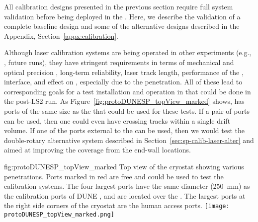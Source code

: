 
All calibration designs presented in the previous section require full system validation before being deployed in the  . Here, we describe the validation of a complete baseline design and some of the alternative designs described in the Appendix, Section~\ref{appx:calibration}.

Although laser calibration systems are being operated in other  experiments (e.g., , future  runs), they have stringent requirements in terms of mechanical and optical precision , long-term reliability, laser track length, performance of the ,  interface, and effect on \efield, especially due to the  penetration. 
All of these lead to corresponding goals for a test installation and operation in  that could be done in the post-LS2 run. As Figure~\ref{fig:protoDUNESP_topView_marked} shows,  has ports of the same size as the   that could be used for these tests. If a pair of ports can be used, then one could even have crossing tracks within a single drift volume. If one of the ports external to the  can be used, then we would test the double-rotary alternative system described in Section~\ref{sec:sp-calib-laser-alter} and aimed at improving the coverage from the end-wall locations.

\begin{dunefigure}{fig:protoDUNESP_topView_marked}
{Top view of the  cryostat showing various penetrations. Ports marked in red are free and could be used to test the calibration systems. The four largest ports have the same diameter (\SI{250}{\milli\m}) as the calibration ports of DUNE , and are located over the . The largest ports at the right side corners of the cryostat are the human access ports.}
\texttt{[image: protoDUNESP\_topView\_marked.png]}
\end{dunefigure}

